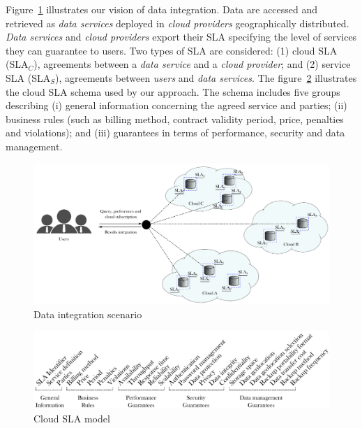 
Figure~\ref{fig:scenario} illustrates our vision of data integration. Data are accessed and retrieved as \textit{data services} deployed in \textit{cloud providers} geographically distributed. \textit{Data services} and \textit{cloud providers} export their SLA specifying the level of services they can guarantee to users. Two types of SLA are considered: (1) cloud SLA (SLA$_{C}$), agreements between a \textit{data service} and a \textit{cloud provider}; and (2) service SLA (SLA$_{S}$), agreements between \textit{users} and \textit{data services}. The figure~\ref{fig:cloudsla} illustrates the cloud SLA schema used by our approach. The schema includes five groups describing (i) general information concerning the agreed service and parties; (ii) business rules (such as billing method, contract validity period, price, penalties and violations); and (iii) guarantees in terms of performance, security and data management.  

\begin{figure}[th!]
\center
\includegraphics[scale=0.40]{scenario.pdf}
\caption{Data integration scenario}\label{fig:scenario}
\end{figure}

\begin{figure}[th!]
\center
\includegraphics[scale=0.50]{Cloud_SLA.pdf}
\caption{Cloud SLA model}\label{fig:cloudsla}
\end{figure}

